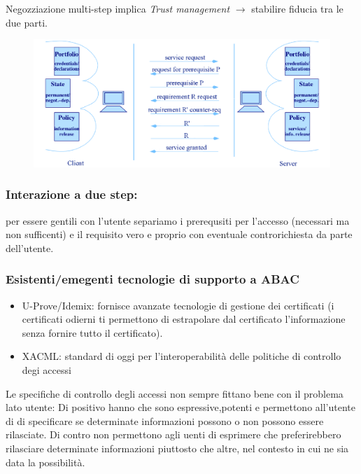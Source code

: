 \documentclass{report}
\begin{document}
\noindent Negozziazione multi-step implica \textit{Trust management} $ \rightarrow $ stabilire fiducia tra le due parti.

\begin{figure}[ht]
    \centering
    \includegraphics[width=1\linewidth]{images/interactive access control 2.png}
\end{figure}

\subsubsection{Interazione a due step:}
per essere gentili con l'utente separiamo i prerequsiti per l'accesso (necessari ma non sufficenti) e il requisito vero e proprio
con eventuale controrichiesta da parte dell'utente.

\subsubsection{Esistenti/emegenti tecnologie di supporto a ABAC}
\begin{itemize}
    \item U-Prove/Idemix: fornisce avanzate tecnologie di gestione dei certificati (i certificati odierni ti permettono di estrapolare dal certificato
    l'informazione senza fornire tutto il certificato).
    \item XACML: standard di oggi per l'interoperabilità delle politiche di controllo degi accessi
\end{itemize}

Le specifiche di controllo degli accessi non sempre fittano bene con il problema lato utente:
Di positivo hanno che sono espressive,potenti e permettono all'utente di di specificare se determinate informazioni possono o non possono essere rilasciate.
Di contro non permettono agli uenti di esprimere che preferirebbero rilasciare determinate informazioni piuttosto che altre, nel contesto in cui ne sia data la possibilità.
\end{document}
